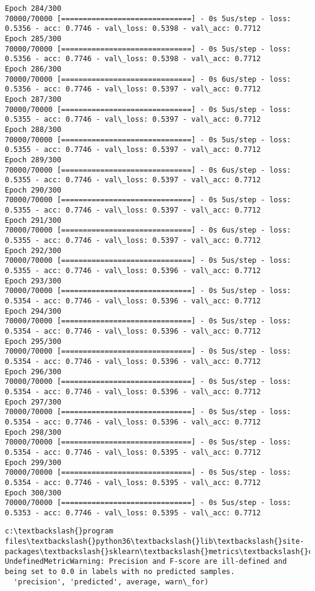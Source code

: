 \documentclass[11pt]{article}
\begin{document}
\begin{Verbatim}[commandchars=\\\{\}]
Epoch 284/300
70000/70000 [==============================] - 0s 5us/step - loss: 0.5356 - acc: 0.7746 - val\_loss: 0.5398 - val\_acc: 0.7712
Epoch 285/300
70000/70000 [==============================] - 0s 5us/step - loss: 0.5356 - acc: 0.7746 - val\_loss: 0.5398 - val\_acc: 0.7712
Epoch 286/300
70000/70000 [==============================] - 0s 6us/step - loss: 0.5356 - acc: 0.7746 - val\_loss: 0.5397 - val\_acc: 0.7712
Epoch 287/300
70000/70000 [==============================] - 0s 5us/step - loss: 0.5355 - acc: 0.7746 - val\_loss: 0.5397 - val\_acc: 0.7712
Epoch 288/300
70000/70000 [==============================] - 0s 5us/step - loss: 0.5355 - acc: 0.7746 - val\_loss: 0.5397 - val\_acc: 0.7712
Epoch 289/300
70000/70000 [==============================] - 0s 6us/step - loss: 0.5355 - acc: 0.7746 - val\_loss: 0.5397 - val\_acc: 0.7712
Epoch 290/300
70000/70000 [==============================] - 0s 5us/step - loss: 0.5355 - acc: 0.7746 - val\_loss: 0.5397 - val\_acc: 0.7712
Epoch 291/300
70000/70000 [==============================] - 0s 6us/step - loss: 0.5355 - acc: 0.7746 - val\_loss: 0.5397 - val\_acc: 0.7712
Epoch 292/300
70000/70000 [==============================] - 0s 5us/step - loss: 0.5355 - acc: 0.7746 - val\_loss: 0.5396 - val\_acc: 0.7712
Epoch 293/300
70000/70000 [==============================] - 0s 5us/step - loss: 0.5354 - acc: 0.7746 - val\_loss: 0.5396 - val\_acc: 0.7712
Epoch 294/300
70000/70000 [==============================] - 0s 5us/step - loss: 0.5354 - acc: 0.7746 - val\_loss: 0.5396 - val\_acc: 0.7712
Epoch 295/300
70000/70000 [==============================] - 0s 5us/step - loss: 0.5354 - acc: 0.7746 - val\_loss: 0.5396 - val\_acc: 0.7712
Epoch 296/300
70000/70000 [==============================] - 0s 5us/step - loss: 0.5354 - acc: 0.7746 - val\_loss: 0.5396 - val\_acc: 0.7712
Epoch 297/300
70000/70000 [==============================] - 0s 5us/step - loss: 0.5354 - acc: 0.7746 - val\_loss: 0.5396 - val\_acc: 0.7712
Epoch 298/300
70000/70000 [==============================] - 0s 5us/step - loss: 0.5354 - acc: 0.7746 - val\_loss: 0.5395 - val\_acc: 0.7712
Epoch 299/300
70000/70000 [==============================] - 0s 5us/step - loss: 0.5354 - acc: 0.7746 - val\_loss: 0.5395 - val\_acc: 0.7712
Epoch 300/300
70000/70000 [==============================] - 0s 5us/step - loss: 0.5353 - acc: 0.7746 - val\_loss: 0.5395 - val\_acc: 0.7712

    \end{Verbatim}

    \begin{Verbatim}[commandchars=\\\{\}]
c:\textbackslash{}program files\textbackslash{}python36\textbackslash{}lib\textbackslash{}site-packages\textbackslash{}sklearn\textbackslash{}metrics\textbackslash{}classification.py:1143: UndefinedMetricWarning: Precision and F-score are ill-defined and being set to 0.0 in labels with no predicted samples.
  'precision', 'predicted', average, warn\_for)

    \end{Verbatim}
\end{document}
